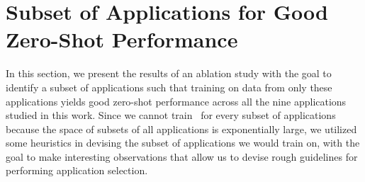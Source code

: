 
\section{{Subset of Applications for Good Zero-Shot Performance}}
%
\begin{table}[t]
\small
\centering
\vspace*{0.0cm}
\caption{\label{table:zero_shot_all_2} \footnotesize {}}
\vspace{-0.1cm}
\end{table}
%
{In this section, we present the results of an ablation study with the goal to identify a subset of applications such that training on data from only these applications yields good zero-shot performance across all the nine applications studied in this work.
%
Since we cannot train \primemethodname\ for every subset of applications because the space of subsets of all applications is exponentially large, we utilized some heuristics in devising the subset of applications we would train on, with the goal to make interesting observations that allow us to devise rough guidelines for performing application selection.}

